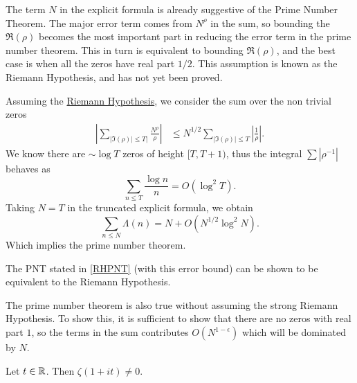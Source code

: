 The term $N$ in the explicit formula is already suggestive of the Prime Number Theorem. 
The major error term comes from $N^\rho$ in the sum, so bounding the $\Re(\rho)$ becomes the most important part in reducing the error term in the prime number theorem. 
This in turn is equivalent to bounding $\Re({\rho})$, and the best case is when all the zeros have real part $1/2$. This assumption is known as the Riemann Hypothesis, and has not yet been proved. 

Assuming the \hyperref[RH]{Riemann Hypothesis}, we consider the sum over the non trivial zeros \begin{align*}
\left|\sum_{|\Im(\rho)|\leq T|}\frac{N^\rho}{\rho}\right| &\leq N^{1/2} \sum_{|\Im(\rho)|\leq T}\left|{\frac{1}{\rho}}\right|.    
\end{align*}
We know there are $\sim \log T$ zeros of height $[T,T+1)$, thus the integral $\sum |\rho^{-1}|$ behaves as \[
\sum_{n\leq T} \frac{\log n}{n} = O(\log^2 T).
\]
Taking $N=T$ in the truncated explicit formula, we obtain \begin{equation} \label{RHPNT}
    \sum_{n\leq N} \Lambda(n) = N + O(N^{1/2}\log^2 N).
\end{equation}
Which implies the prime number theorem.
\begin{remark}
    The PNT stated in \ref{RHPNT} (with this error bound) can be shown to be equivalent to the Riemann Hypothesis.
\end{remark}
The prime number theorem is also true without assuming the strong Riemann Hypothesis. 
To show this, it is sufficient to show that there are no zeros with real part $1$, so the terms in the sum contributes $O(N^{1-\epsilon})$
which will be dominated by $N$.
\begin{theorem}\label{nozerosatone}
    Let $t\in\mathbb{R}$. Then $\zeta(1+it)\neq 0$.
\end{theorem}

